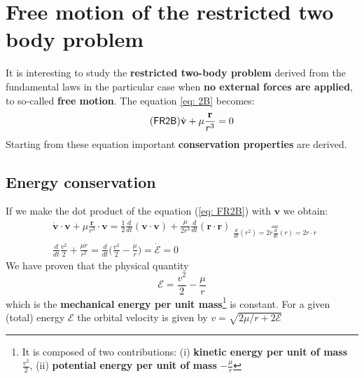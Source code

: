 \section{Free motion of the restricted two body problem}
It is interesting to study the \textbf{restricted two-body problem} derived from the fundamental laws in the particular case when \textbf{no external forces are applied}, to so-called \textbf{free motion}. The equation \ref{eq: 2B} becomes:
\begin{equation}\tag{\textsf{FR2B}} \label{eq: FR2B}
    \dot{\mathbf{v}} + \mu \frac{\mathbf{r}}{r^3}=0
\end{equation}
Starting from these equation important \textbf{conservation properties} are derived.

\subsection{Energy conservation}
If we make the dot product of the equation (\ref{eq: FR2B}) with $\mathbf{v}$ we obtain:
{\large{
    \begin{align*}
        &\dot{\mathbf{v}} \cdot \mathbf{v} + \mu \frac{\mathbf{r}}{r^3}\cdot \mathbf{v} =
        \frac{1}{2}\frac{d}{dt}(\mathbf{v}\cdot\mathbf{v}) + \frac{\mu}{2r^3}\frac{d}{dt}(\mathbf{r}\cdot\mathbf{r}) \underset{\frac{d}{dt}(r^2)=2r\frac{d}{dt}(r)=2r\cdot\dot{r}}{=}\\ 
        &\frac{d}{dt}\frac{v^2}{2} + \frac{\mu\dot{r}}{r^2} =\frac{d}{dt}\biggl(
            \frac{v^2}{2} - \frac{\mu}{r}
        \biggr) = \dot{\mathcal{E}}=0
    \end{align*}
}}
\noindent
We have proven that the physical quantity
\begin{equation*}
    \mathcal{E} = \frac{v^2}{2} - \frac{\mu}{r}
\end{equation*}
which is the \textbf{mechanical energy per unit mass}\footnote[7]{It is composed of two contributions: (i) \textbf{kinetic energy per unit of mass $\frac{v^2}{2}$}, (ii) \textbf{potential energy per unit of mass} $-\frac{\mu}{r}$ } is constant. For a given (total) energy $\mathcal{E}$ the orbital velocity is given by $v=\sqrt{2\mu/r+2\mathcal{E}}$

